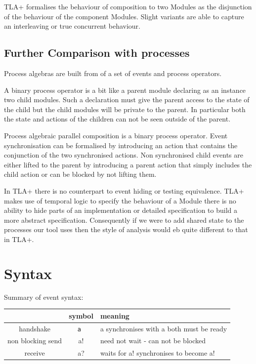 \documentclass[]{article}
\begin{document}
TLA+ formalises the behaviour of  composition to two Modules as the disjunction of the behaviour of the component Modules. Slight variants are able to capture an interleaving or true concurrent behaviour.

\subsection{Further Comparison with processes}

Process algebras are built from  of a set of events and process operators.


A binary process operator  is a bit like a parent module declaring as an instance two child modules.  Such a declaration must give the parent access to the state of the child but  the child modules will be private to the parent.  In particular both the state and actions of the children can not be seen outside of the parent.  

Process algebraic parallel composition  is a binary process operator.
Event synchronisation can be formalised by introducing an action that contains the conjunction of the two synchronised actions. Non synchronised child events are either lifted to the parent  by introducing a parent action that simply includes the child action or can be blocked by not lifting them.



In TLA+ there is no counterpart to event hiding or testing equivalence. TLA+ makes use of temporal logic to specify the behaviour of a Module there is no ability to hide parts of an implementation or  detailed specification  to build a more abstract specification. 
Consequently if we were to add shared state to the processes our tool uses then the style of analysis would eb quite different to that in TLA+.


\newpage
\section{Syntax}

Summary of event syntax:

\vspace{1ex}
\begin{tabular}{|c|c|l|} \hline  & symbol & meaning\\ \hline
handshake  & {\tt a } & {\sf a} synchronises with {\sf a}   both must be ready\\ \hline
non blocking send   & {\sf a!}  & need not wait - can not be blocked\\ \hline
receive   & {\sf a?}  & waits for {\sf a!} synchronises to become {\sf a!} \\ \hline

\end{tabular}
\end{document}
